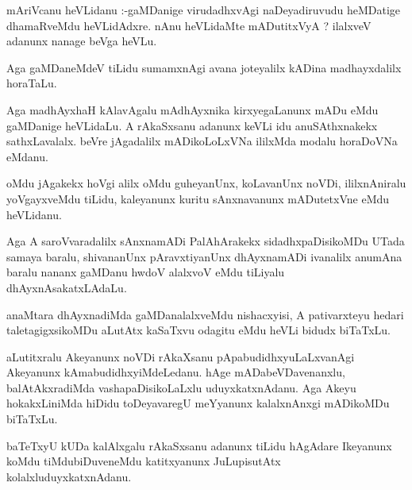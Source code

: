 \documentclass{article}
\begin{document}
\begin{mn}
mAriVcanu  heVLidanu :-gaMDanige  virudadhxvAgi  naDeyadiruvudu  heMDatige  dhamaRveMdu  heVLidAdxre.  
nAnu  heVLidaMte  mADutitxVyA ?  ilalxveV  adanunx  nanage  beVga  heVLu.
\end{mn}

\begin{mn}
Aga  gaMDaneMdeV  tiLidu  sumamxnAgi  avana  joteyalilx  kADina  madhayxdalilx  horaTaLu.
\end{mn}

\begin{mn}
Aga  madhAyxhaH  kAlavAgalu  mAdhAyxnika  kirxyegaLanunx  mADu  eMdu  gaMDanige  heVLidaLu.  
A  rAkaSxsanu  adanunx  keVLi  idu  anuSAthxnakekx  sathxLavalalx.  beVre  jAgadalilx  
mADikoLoLxVNa  ililxMda  modalu  horaDoVNa  eMdanu.
\end{mn}

\begin{mn}
oMdu  jAgakekx  hoVgi  alilx  oMdu  guheyanUnx,  koLavanUnx  noVDi,  ililxnAniralu  yoVgayxveMdu  
tiLidu,  kaleyanunx  kuritu  sAnxnavanunx  mADutetxVne  eMdu  heVLidanu.
\end{mn}

\begin{mn}
Aga  A  saroVvaradalilx  sAnxnamADi  PalAhArakekx  sidadhxpaDisikoMDu  UTada  samaya  baralu,  
shivananUnx  pAravxtiyanUnx  dhAyxnamADi  ivanalilx  anumAna  baralu  nananx  gaMDanu  hwdoV  
alalxvoV  eMdu  tiLiyalu  dhAyxnAsakatxLAdaLu.
\end{mn}

\begin{mn}
anaMtara  dhAyxnadiMda  gaMDanalalxveMdu  nishacxyisi,  A  pativarxteyu  hedari  taletagigxsikoMDu  aLutAtx  
kaSaTxvu  odagitu  eMdu  heVLi  bidudx biTaTxLu.
\end{mn}

\begin{mn}
aLutitxralu  Akeyanunx  noVDi  rAkaXsanu  pApabudidhxyuLaLxvanAgi  Akeyanunx  kAmabudidhxyiMdeLedanu.  
hAge  mADabeVDavenanxlu,  balAtAkxradiMda  vashapaDisikoLaLxlu  uduyxkatxnAdanu.  Aga  Akeyu  hokakxLiniMda  
hiDidu  toDeyavaregU  meYyanunx  kalalxnAnxgi  mADikoMDu  biTaTxLu.
\end{mn}

\begin{mn}
baTeTxyU  kUDa  kalAlxgalu  rAkaSxsanu  adanunx  tiLidu  hAgAdare  Ikeyanunx  koMdu  tiMdubiDuveneMdu  
katitxyanunx  JuLupisutAtx  kolalxluduyxkatxnAdanu.
\end{mn}
\end{document}
